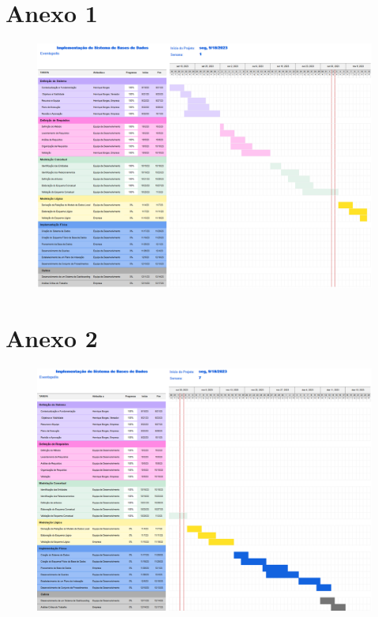 \documentclass[a4paper,12pt]{scrreprt}
\begin{document}
    \section{Anexo 1} \label{GANTT}
        \begin{figure}[h]
            \centering
            \includegraphics[width=6.2in]{images/GANTT.png}
        \end{figure}
\newpage
    \section{Anexo 2} \label{GANTT_c2}
        \begin{figure}[h]
            \centering
            \includegraphics[width=6.2in]{images/GANTT_c2.png}
        \end{figure}
\newpage
\end{document}

